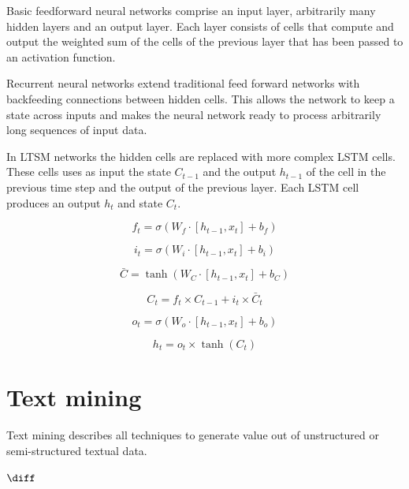 Basic feedforward neural networks comprise an input layer, arbitrarily many hidden layers and an output layer.
Each layer consists of cells that compute and output the weighted sum of the cells of the previous layer that has been passed to an activation function.


Recurrent neural networks extend traditional feed forward networks with backfeeding connections between hidden cells.
This allows the network to keep a state across inputs and makes the neural network ready to process arbitrarily long sequences of input data.

In LTSM networks the hidden cells are replaced with more complex LSTM cells.
These cells uses as input the state $C_{t-1}$ and the output $h_{t-1}$ of the cell in the previous time step and the output of the previous layer.
Each LSTM cell produces an output $h_t$ and state $C_t$.


\begin{equation}\label{key}
	f_t = \sigma(W_f \cdot [h_{t-1}, x_t] + b_f)
\end{equation}

\begin{equation}\label{key}
	i_t = \sigma (W_i \cdot [h_{t-1}, x_t] + b_i)
\end{equation}

\begin{equation}\label{key}
	\bar{C} = \tanh (W_C \cdot [h_{t-1}, x_t] + b_C)
\end{equation}

\begin{equation}\label{key}
	C_t = f_t \times C_{t-1} + i_t \times \bar{C}_t
\end{equation}

\begin{equation}\label{key}
	o_t = \sigma (W_o \cdot [h_{t-1}, x_t] + b_o)
\end{equation}

\begin{equation}\label{key}
	h_t = o_t \times \tanh(C_t )
\end{equation}


\section{Text mining}

Text mining describes all techniques to generate value out of unstructured or semi-structured textual data.


$\diff$